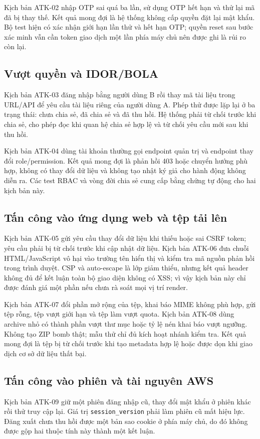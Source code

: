 Kịch bản ATK-02 nhập OTP sai quá ba lần, sử dụng OTP hết hạn và thử lại mã đã bị thay thế. Kết quả mong đợi là hệ thống không cấp quyền đặt lại mật khẩu. Bộ test hiện có xác nhận giới hạn lần thử và hết hạn OTP; quyền reset sau bước xác minh vẫn cần token giao dịch một lần phía máy chủ nên được ghi là rủi ro còn lại.

\subsection{Vượt quyền và IDOR/BOLA}
Kịch bản ATK-03 đăng nhập bằng người dùng B rồi thay mã tài liệu trong URL/API để yêu cầu tài liệu riêng của người dùng A. Phép thử được lặp lại ở ba trạng thái: chưa chia sẻ, đã chia sẻ và đã thu hồi. Hệ thống phải từ chối trước khi chia sẻ, cho phép đọc khi quan hệ chia sẻ hợp lệ và từ chối yêu cầu mới sau khi thu hồi.

Kịch bản ATK-04 dùng tài khoản thường gọi endpoint quản trị và endpoint thay đổi role/permission. Kết quả mong đợi là phản hồi 403 hoặc chuyển hướng phù hợp, không có thay đổi dữ liệu và không tạo nhật ký giả cho hành động không diễn ra. Các test RBAC và vòng đời chia sẻ cung cấp bằng chứng tự động cho hai kịch bản này.

\subsection{Tấn công vào ứng dụng web và tệp tải lên}
Kịch bản ATK-05 gửi yêu cầu thay đổi dữ liệu khi thiếu hoặc sai CSRF token; yêu cầu phải bị từ chối trước khi cập nhật dữ liệu. Kịch bản ATK-06 đưa chuỗi HTML/JavaScript vô hại vào trường tên hiển thị và kiểm tra mã nguồn phản hồi trong trình duyệt. CSP và auto-escape là lớp giảm thiểu, nhưng kết quả header không đủ để kết luận toàn bộ giao diện không có XSS; vì vậy kịch bản này chỉ được đánh giá một phần nếu chưa rà soát mọi vị trí render.

Kịch bản ATK-07 đổi phần mở rộng của tệp, khai báo MIME không phù hợp, gửi tệp rỗng, tệp vượt giới hạn và tệp làm vượt quota. Kịch bản ATK-08 dùng archive nhỏ có thành phần vượt thư mục hoặc tỷ lệ nén khai báo vượt ngưỡng. Không tạo ZIP bomb thật; mẫu thử chỉ đủ kích hoạt nhánh kiểm tra. Kết quả mong đợi là tệp bị từ chối trước khi tạo metadata hợp lệ hoặc được dọn khi giao dịch cơ sở dữ liệu thất bại.

\subsection{Tấn công vào phiên và tài nguyên AWS}
Kịch bản ATK-09 giữ một phiên đăng nhập cũ, thay đổi mật khẩu ở phiên khác rồi thử truy cập lại. Giá trị \texttt{session\_version} phải làm phiên cũ mất hiệu lực. Đăng xuất chưa thu hồi được một bản sao cookie ở phía máy chủ, do đó không được gộp hai thuộc tính này thành một kết luận.


